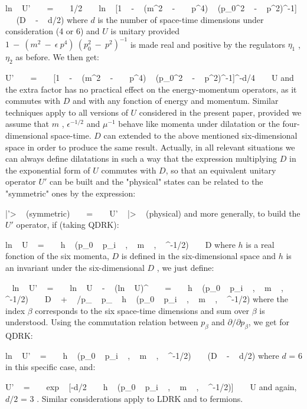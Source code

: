 \documentclass[a4paper,12pt,dvips]{article}
\begin{document}
\equation
ln ~ U' ~ ~ = ~ ~ 1/2 ~ ~ ln ~ [1 ~ - ~ (m^2 ~ - ~ \epsilon ~ p^4) ~ (p_0^2 ~ - ~ p^2)^{-1}] ~ ~(D ~ - ~ d/2)
\endequation
\noindent
where $d$ is the number of space-time dimensions under consideration (4 or 6) and $U$ is unitary provided $1 ~ - ~ (m^2 ~ - ~ \epsilon ~ p^4) ~ (p_0^2 ~ - ~ p^2)^{-1}$ is made real and positive by the regulators $\eta _1$ , $\eta _2$ as before. We then get:

\equation
U' ~ ~ = ~ ~ [1 ~ - ~ (m^2 ~ - ~ \epsilon ~ p^4) ~ (p_0^2 ~ - ~ p^2)^{-1}]^{-d/4} ~ ~ U
\endequation
\noindent 
and the extra factor has no practical effect on the energy-momentum operators, as it commutes with $D$ and with any fonction of energy and momentum. Similar techniques apply to all versions of $U$ considered in the present paper, provided we assume that $m$ , $\epsilon ^{-1/2} $ and $\mu ^{-1}$ behave like momenta under dilatation or the four-dimensional space-time. $D$ can extended to the above mentioned six-dimensional space in order to produce the same result. Actually, in all relevant situations we can always define dilatations in such a way that the expression multiplying $D$ in the exponential form of $U$ commutes with $D$, so that an equivalent unitary operator $U'$ can be built and the "physical" states can be related to the "symmetric" ones by the expression: 

\equation
|\psi '> ~ (symmetric) ~ ~ = ~ ~ U' ~ |\psi> ~ (physical)
\endequation
\noindent 
and more generally, to build the $U'$ operator, if (taking QDRK):

\equation
ln ~ U ~ = ~ ~ h ~ (p_0 ~ p_i ~ , ~ m ~ , ~ \epsilon ^{-1/2}) ~ ~ D
\endequation
\noindent 
where $h$ is a real fonction of the six momenta, $D$ is defined in the six-dimensional space and $h$ is an invariant under the six-dimensional $D$ , we just define:

 ~ ln ~ U' ~ = ~ ~ ln ~ U ~ - ~ (ln ~ U)^{\dagger } ~ ~ = ~ ~ h ~ (p_0 ~ p_i ~ , ~ m ~ , ~ \epsilon ^{-1/2}) ~ ~ D ~ + ~ \partial /\partial p_{\beta} ~ p_{\beta} ~ h ~ (p_0 ~ p_i ~ , ~ m ~ , ~ \epsilon ^{-1/2})
\endequation
\noindent
where the index $\beta $ corresponds to the six space-time dimensions and sum over $\beta $ is understood. Using the commutation relation between $ p_{\beta}$ and $\partial /\partial p_{\beta}$, we get for QDRK:

\equation
ln ~ U' ~ = ~ ~ h ~ (p_0 ~ p_i ~ , ~ m ~ , ~ \epsilon ^{-1/2}) ~ ~ (D ~ - ~ d/2)
\endequation
\noindent 
where $d$ = 6 in this specific case, and:

\equation
U' ~ = ~ ~ exp ~ [-d/2 ~ ~ h ~ (p_0 ~ p_i ~ , ~ m ~ , ~ \epsilon ^{-1/2})] ~ ~ U
\endequation
\noindent 
and again, $d/2$ = 3 . Similar considerations apply to LDRK and to fermions.
\end{document}
